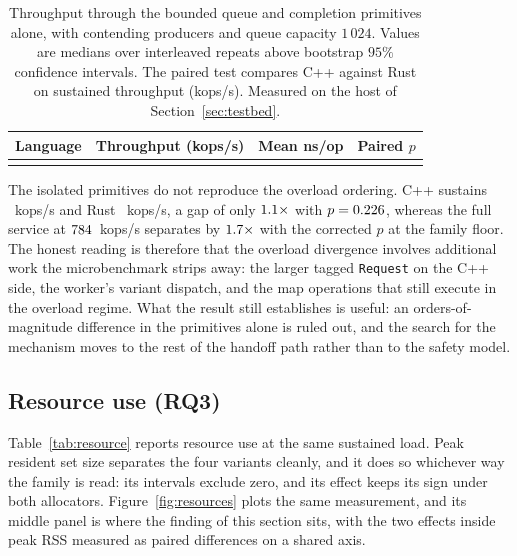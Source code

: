 \documentclass[english,twoside,openright,a4paper,censored,csm,software-track-2020]{HYthesisML}
\begin{document}
\begin{table}[H]
\centering
\small
\caption[Throughput through the contended synchronisation primitives alone]{Throughput through
the bounded queue and completion primitives alone, with \ContentionProducers{} contending producers
and queue capacity $1\,024$. Values are medians over \ContentionRepeats{} interleaved repeats above
bootstrap $95\%$ confidence intervals. The paired test compares C++ against Rust on sustained
throughput (kops/s). Measured on the host of Section~\ref{sec:testbed}.\label{tab:contention}}
\begin{tabular}{@{}l r r r@{}}
\hline\hline
Language & Throughput (kops/s) & Mean ns/op & Paired $p$ \\
\hline
\\
\hline
\end{tabular}
\end{table}

The isolated primitives do not reproduce the overload ordering. C++ sustains
\ContentionThrCpp{}~kops/s and Rust \ContentionThrRust{}~kops/s, a gap of only
$1.1\times$ with $p = 0.226$, whereas the full service at
$784$~kops/s separates by $1.7\times$ with the corrected $p$ at the
family floor. The honest reading is therefore that the overload divergence involves additional
work the microbenchmark strips away: the larger tagged \texttt{Request} on the C++ side, the
worker's variant dispatch, and the map operations that still execute in the overload regime.
What the result still establishes is useful: an orders-of-magnitude difference in the primitives
alone is ruled out, and the search for the mechanism moves to the rest of the handoff path rather
than to the safety model.

\subsection{Resource use (RQ3)}\label{sec:resources}
Table~\ref{tab:resource} reports resource use at the same
sustained load. Peak resident set size separates the four variants cleanly, and it does so
whichever way the family is read: its intervals exclude zero, and its effect keeps its sign under
both allocators. Figure~\ref{fig:resources} plots the same measurement, and its middle panel is
where the finding of this section sits, with the two effects inside peak RSS measured as paired
differences on a shared axis.
\end{document}
